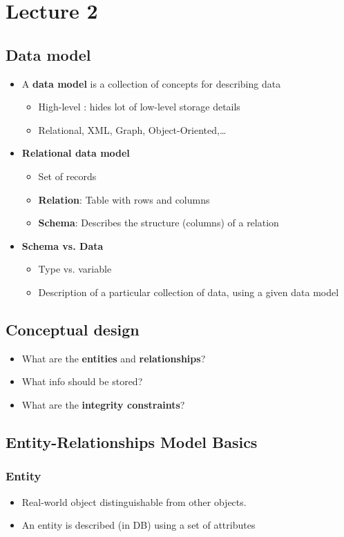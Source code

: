 \documentclass[11pt]{article}
\begin{document}
\section{Lecture 2}
\label{sec:org5bf52d6}
\subsection{Data model}
\label{sec:org61f1c6b}
\begin{itemize}
\item A \textbf{data model} is a collection of concepts for describing data
\begin{itemize}
\item High-level : hides lot of low-level storage details
\item Relational, XML, Graph, Object-Oriented,\ldots{}
\end{itemize}
\item \textbf{Relational data model}
\begin{itemize}
\item Set of records
\item \textbf{Relation}: Table with rows and columns
\item \textbf{Schema}: Describes the structure (columns) of a relation
\end{itemize}
\item \textbf{Schema vs. Data}
\begin{itemize}
\item Type vs. variable
\item Description of a particular collection of data, using a given data model
\end{itemize}
\end{itemize}
\subsection{Conceptual design}
\label{sec:orgb65d460}
\begin{itemize}
\item What are the \textbf{entities} and \textbf{relationships}?
\item What info should be stored?
\item What are the \textbf{integrity constraints}?
\end{itemize}
\subsection{Entity-Relationships Model Basics}
\label{sec:org2b2ca32}
\subsubsection{Entity}
\label{sec:org239b8d2}
\begin{itemize}
\item Real-world object distinguishable from other objects.
\item An entity is described (in DB) using a set of attributes
\end{itemize}
\end{document}
